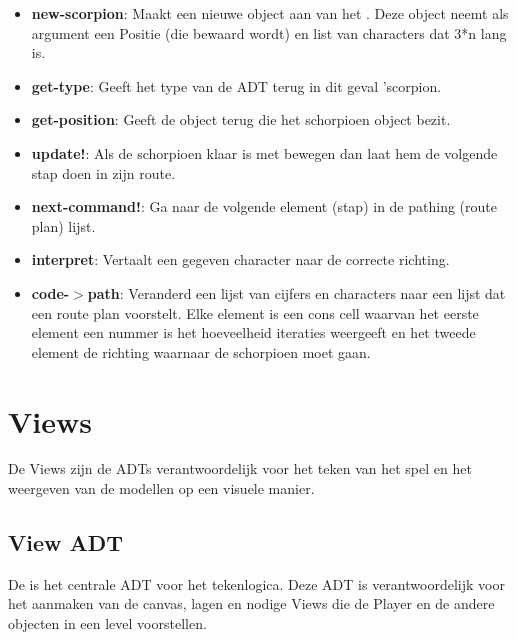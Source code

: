 \begin{itemize}
	\item \textbf{new-scorpion}: Maakt een nieuwe object aan van het \texttt{}.
		Deze object neemt als argument een Positie (die bewaard wordt)
		en list van characters dat 3*n lang is.
	\item \textbf{get-type}: Geeft het type van de ADT terug in dit geval 'scorpion.
	\item \textbf{get-position}: Geeft de \texttt{} object terug die het schorpioen object bezit.
	\item \textbf{update!}: Als de schorpioen klaar is met bewegen dan laat hem de volgende stap doen in zijn route.
	\item \textbf{next-command!}: Ga naar de volgende element (stap) in de pathing (route plan) lijst.
	\item \textbf{interpret}: Vertaalt een gegeven character naar de correcte richting.
	\item \textbf{code-$>$path}: Veranderd een lijst van cijfers en characters naar een lijst dat een route plan voorstelt.
		Elke element is een cons cell 
		waarvan het eerste element een nummer is het hoeveelheid iteraties weergeeft
		en het tweede element de richting waarnaar de schorpioen moet gaan.
\end{itemize}

\section{Views}
\label{view}
De Views zijn de ADTs verantwoordelijk voor het teken van het spel en het weergeven van de modellen op een visuele manier.

\subsection{View ADT}
\label{section:view}
De \texttt{} is het centrale ADT voor het tekenlogica.
Deze ADT is verantwoordelijk voor het aanmaken van de canvas, lagen en nodige Views die de Player en de andere objecten in een level voorstellen.

